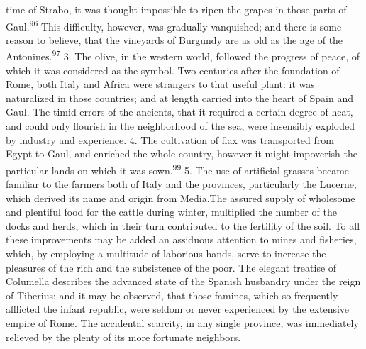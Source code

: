 time of Strabo, it was thought impossible to ripen the grapes in
those parts of Gaul.\textsuperscript{96} This difficulty, however, was gradually
vanquished; and there is some reason to believe, that the
vineyards of Burgundy are as old as the age of the Antonines.\textsuperscript{97}
3. The olive, in the western world, followed the progress of
peace, of which it was considered as the symbol. Two centuries
after the foundation of Rome, both Italy and Africa were
strangers to that useful plant: it was naturalized in those
countries; and at length carried into the heart of Spain and
Gaul. The timid errors of the ancients, that it required a
certain degree of heat, and could only flourish in the
neighborhood of the sea, were insensibly exploded by industry and
experience. 4. The cultivation of flax was transported from Egypt
to Gaul, and enriched the whole country, however it might
impoverish the particular lands on which it was sown.\textsuperscript{99} 5. The
use of artificial grasses became familiar to the farmers both of
Italy and the provinces, particularly the Lucerne, which derived
its name and origin from Media.\pagenote[100] The assured supply of
wholesome and plentiful food for the cattle during winter,
multiplied the number of the docks and herds, which in their turn
contributed to the fertility of the soil. To all these
improvements may be added an assiduous attention to mines and
fisheries, which, by employing a multitude of laborious hands,
serve to increase the pleasures of the rich and the subsistence
of the poor. The elegant treatise of Columella describes the
advanced state of the Spanish husbandry under the reign of
Tiberius; and it may be observed, that those famines, which so
frequently afflicted the infant republic, were seldom or never
experienced by the extensive empire of Rome. The accidental
scarcity, in any single province, was immediately relieved by the
plenty of its more fortunate neighbors.




